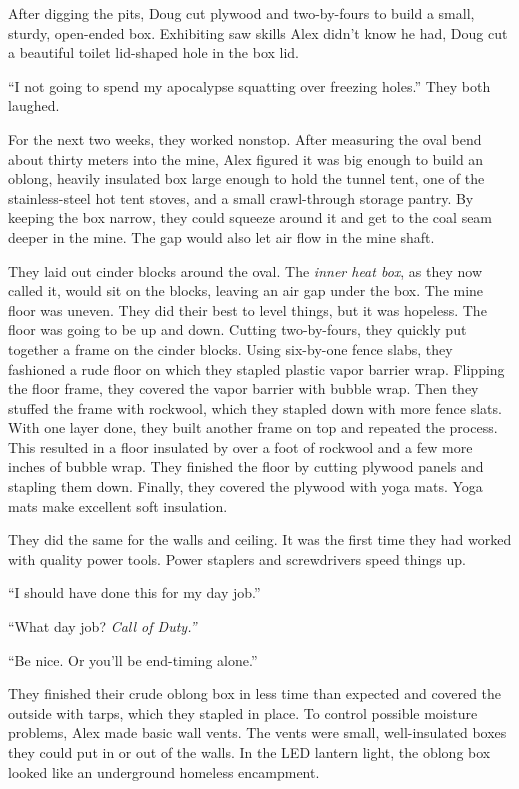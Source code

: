 After digging the pits, Doug cut plywood and two-by-fours to build a
small, sturdy, open-ended box. Exhibiting saw skills Alex didn't know he
had, Doug cut a beautiful toilet lid-shaped hole in the box lid.

``I not going to spend my apocalypse squatting over freezing holes.''
They both laughed.

For the next two weeks, they worked nonstop. After measuring the oval
bend about thirty meters into the mine, Alex figured it was big enough
to build an oblong, heavily insulated box large enough to hold the
tunnel tent, one of the stainless-steel hot tent stoves, and a small
crawl-through storage pantry. By keeping the box narrow, they could
squeeze around it and get to the coal seam deeper in the mine. The gap
would also let air flow in the mine shaft.

They laid out cinder blocks around the oval. The \emph{inner heat box},
as they now called it, would sit on the blocks, leaving an air gap under
the box. The mine floor was uneven. They did their best to level things,
but it was hopeless. The floor was going to be up and down. Cutting
two-by-fours, they quickly put together a frame on the cinder blocks.
Using six-by-one fence slabs, they fashioned a rude floor on which they
stapled plastic vapor barrier wrap. Flipping the floor frame, they
covered the vapor barrier with bubble wrap. Then they stuffed the frame
with rockwool, which they stapled down with more fence slats. With one
layer done, they built another frame on top and repeated the process.
This resulted in a floor insulated by over a foot of rockwool and a few
more inches of bubble wrap. They finished the floor by cutting plywood
panels and stapling them down. Finally, they covered the plywood with
yoga mats. Yoga mats make excellent soft insulation.

They did the same for the walls and ceiling. It was the first time they
had worked with quality power tools. Power staplers and screwdrivers
speed things up.

``I should have done this for my day job.''

``What day job? \emph{Call of Duty.''}

``Be nice. Or you'll be end-timing alone.''

They finished their crude oblong box in less time than expected and
covered the outside with tarps, which they stapled in place. To control
possible moisture problems, Alex made basic wall vents. The vents were
small, well-insulated boxes they could put in or out of the walls. In
the LED lantern light, the oblong box looked like an underground
homeless encampment.

